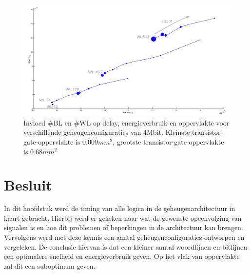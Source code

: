 \begin{figure}[!ht]
  \centering
  \includegraphics[scale=0.6]{../fig/hfdstk-timing-all-sol2.png}
  \caption[Delay, energieverbruik en oppervlakte van alle geheugenconfiguraties]{Invloed \#BL en \#WL op delay, energieverbruik en oppervlakte voor verschillende geheugenconfiguraties van 4Mbit. Kleinste transistor-gate-oppervlakte is $0.009mm^{2}$, grootste transistor-gate-oppervlakte is $0.68mm^{2}$}
  \label{fig:final20all2}
\end{figure} 

\section{Besluit}
In dit hoofdstuk werd de timing van alle logica in de geheugenarchitectuur in kaart gebracht. Hierbij werd er gekeken naar wat de gewenste opeenvolging van signalen is en hoe dit problemen of beperkingen in de architectuur kan brengen. Vervolgens werd met deze kennis een aantal geheugenconfiguraties ontworpen en vergeleken. De conclusie hiervan is dat een kleiner aantal woordlijnen en bitlijnen een optimalere snelheid en energieverbruik geven. Op het vlak van oppervlakte zal dit een suboptimum geven.
